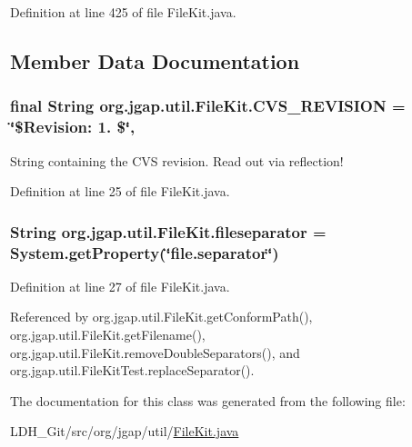 Definition at line 425 of file File\-Kit.\-java.



\subsection{Member Data Documentation}
\hypertarget{classorg_1_1jgap_1_1util_1_1_file_kit_a830187f5a48ba300aa2930d655cd3975}{
\subsubsection[{C\-V\-S\-\_\-\-R\-E\-V\-I\-S\-I\-O\-N}]{\setlength{\rightskip}{0pt plus 5cm}final String org.\-jgap.\-util.\-File\-Kit.\-C\-V\-S\-\_\-\-R\-E\-V\-I\-S\-I\-O\-N = \char`\"{}\$Revision\-: 1. \$\char`\"{}\hspace{0.3cm}{\ttfamily [static]}, {\ttfamily [private]}}}\label{classorg_1_1jgap_1_1util_1_1_file_kit_a830187f5a48ba300aa2930d655cd3975}
String containing the C\-V\-S revision. Read out via reflection! 

Definition at line 25 of file File\-Kit.\-java.

\hypertarget{classorg_1_1jgap_1_1util_1_1_file_kit_a96b5f1e3321a4cf8bc43873ec55866d1}{
\subsubsection[{fileseparator}]{\setlength{\rightskip}{0pt plus 5cm}String org.\-jgap.\-util.\-File\-Kit.\-fileseparator = System.\-get\-Property(\char`\"{}file.\-separator\char`\"{})\hspace{0.3cm}{\ttfamily [static]}}}\label{classorg_1_1jgap_1_1util_1_1_file_kit_a96b5f1e3321a4cf8bc43873ec55866d1}


Definition at line 27 of file File\-Kit.\-java.



Referenced by org.\-jgap.\-util.\-File\-Kit.\-get\-Conform\-Path(), org.\-jgap.\-util.\-File\-Kit.\-get\-Filename(), org.\-jgap.\-util.\-File\-Kit.\-remove\-Double\-Separators(), and org.\-jgap.\-util.\-File\-Kit\-Test.\-replace\-Separator().



The documentation for this class was generated from the following file\-:\begin{DoxyCompactItemize}
\item 
L\-D\-H\-\_\-\-Git/src/org/jgap/util/\hyperlink{_file_kit_8java}{File\-Kit.\-java}\end{DoxyCompactItemize}
